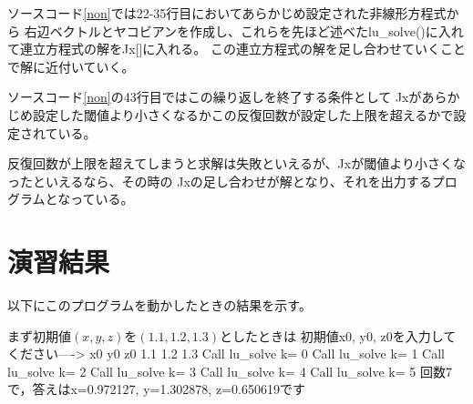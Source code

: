 \documentclass[a4paper,11pt]{jsarticle}
\begin{document}
ソースコード\ref{non}では22-35行目においてあらかじめ設定された非線形方程式から
右辺ベクトルとヤコビアンを作成し、これらを先ほど述べたlu\_solve()に入れて連立方程式の解をJx[]に入れる。
この連立方程式の解を足し合わせていくことで解に近付いていく。

ソースコード\ref{non}の43行目ではこの繰り返しを終了する条件として
Jxがあらかじめ設定した閾値より小さくなるかこの反復回数が設定した上限を超えるかで設定されている。

反復回数が上限を超えてしまうと求解は失敗といえるが、Jxが閾値より小さくなったといえるなら、その時の
Jxの足し合わせが解となり、それを出力するプログラムとなっている。

\section{演習結果}
以下にこのプログラムを動かしたときの結果を示す。

まず初期値$(x,y,z)$を$(1.1,1.2,1.3)$としたときは
初期値x0, y0, z0を入力してください----> x0 y0 z0
1.1 1.2 1.3
Call lu\_solve k= 0
Call lu\_solve k= 1
Call lu\_solve k= 2
Call lu\_solve k= 3
Call lu\_solve k= 4
Call lu\_solve k= 5
回数7で，答えはx=0.972127, y=1.302878, z=0.650619です
\end{document}
